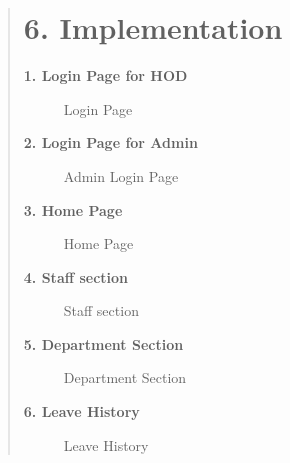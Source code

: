 \documentclass[12pt]{report}
\begin{document}
	
	\begin{quote}
		\section{6. Implementation}
		\textbf{1. Login Page for HOD}
		\begin{figure}[h]
			\centering
			\caption{Login Page}
			\vspace{0.5cm}
		\end{figure}
		
		\textbf{2. Login Page for Admin}
		\begin{figure}[h]
			\centering
			\caption{Admin Login Page}
			\vspace{0.5cm}
		\end{figure}
		
		\clearpage
		
		\textbf{3. Home Page}
		\begin{figure}[h]
			\centering
			\caption{Home Page}
			\vspace{0.5cm}
		\end{figure}
		
		
		
		\textbf{4. Staff section}
		\begin{figure}[h]
			\centering
			\caption{Staff section}
			\vspace{0.5cm}
		\end{figure}
		\clearpage
		
		\textbf{5. Department Section}
		\begin{figure}[h]
			\centering
			\caption{Department Section}
			\vspace{0.5cm}
		\end{figure}
		
		\textbf{6. Leave History}
		\begin{figure}[h]
			\centering
			\caption{Leave History}
			\vspace{0.5cm}
		\end{figure}
		\clearpage
	\end{quote}
	\clearpage
	
\end{document}
